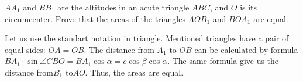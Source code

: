 \problem
$A A_1$ and $B B_1$ are the altitudes in an acute triangle $ABC$, and $O$ is
its circumcenter.
Prove that the areas of the triangles $A O B_1$ and $B O A_1$ are equal.

\solution
Let us use the standart notation in triangle. Mentioned triangles have a pair of equal sides: $OA = OB$. The distance from $A_1$ to $OB$ can be calculated by formula
\(
    B A_1 \cdot \sin \angle CBO
=
    B A_1 \cos \alpha
=
    c \cos \beta \cos\alpha
\).
The same formula give us the distance from$B_1$ to$AO$. Thus, the areas are equal.
\endproblem
